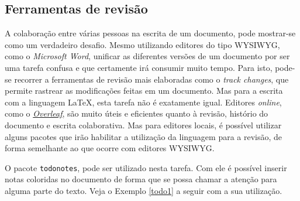\subsection{Ferramentas de revisão}
\label{sec:ferrev}

A colaboração entre várias pessoas na escrita de um documento, pode mostrar-se como um verdadeiro desafio. Mesmo utilizando editores do tipo WYSIWYG, como o \textit{Microsoft Word}, unificar as diferentes versões de um documento por ser uma tarefa confusa e que certamente irá consumir muito tempo. Para isto, pode-se recorrer a ferramentas de revisão mais elaboradas como o \textit{track changes}, que permite rastrear as modificações feitas em um documento. Mas para a escrita com a linguagem \LaTeX{}, esta tarefa não é exatamente igual. Editores \textit{online}, como o \href{https://www.overleaf.com/}{\textit{Overleaf}}, são muito úteis e eficientes quanto à revisão, histório do documento e escrita colaborativa. Mas para editores locais, é possível utilizar alguns pacotes que irão habilitar a utilização da linguagem para a revisão, de forma semelhante ao que ocorre com editores WYSIWYG.

O pacote {\tt todonotes}, pode ser utilizado nesta tarefa. Com ele é possível inserir notas coloridas no documento de forma que se possa chamar a atenção para alguma parte do texto. Veja o Exemplo \ref{todo1} a seguir com a sua utilização.

%
%
%
%
%
%
%
%
%
%

